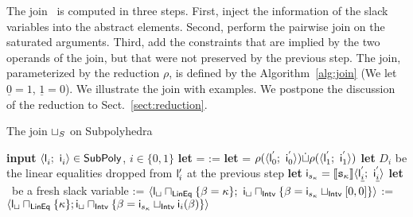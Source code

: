 \documentclass{llncs}
\begin{document}
The join \joinS\ is computed in three steps.
First,  inject the information of the slack variables into the abstract elements.
Second,  perform the  pairwise join  on the saturated arguments. 
Third, add the constraints that are implied by the two operands of the join, but that were not preserved by the previous step.
The join, parameterized by the reduction $\rho$,  is defined by the Algorithm~\ref{alg:join} 
(We let $\underline{0} = 1$, $\underline{1} = 0$).
We illustrate the join with examples. 
 We postpone the discussion of the reduction to Sect.~\ref{sect:reduction}.

\begin{algorithm}[t]
\caption{The join $\sqcup_{S}$ on Subpolyhedra}
\label{alg:join}
\begin{algorithmic}
\STATE \textbf{input} $\langle \mathsf{\mathsf{l}}_{i}^{};\ \mathsf{\mathsf{i}}_{i}^{} \rangle \in \mathsf{SubPoly}$, $i \in \{0, 1\}$
\medskip
\STATE \textbf{let}  = 
\STATE
\smallskip
{}
\STATE   {} :=   
\ENDFOR
\STATE
\smallskip
{}
\STATE  \textbf{let}  \subpolyPair{\sqcup}{} = $\rho(\langle \mathsf{\mathsf{l}}_{0}^{'};\ \mathsf{\mathsf{i}}_{0}^{'} \rangle) \dot\sqcup   \rho(\langle \mathsf{\mathsf{l}}_{1}^{'};\ \mathsf{\mathsf{i}}_{1}^{'} \rangle)$
\STATE
\smallskip
{}
\STATE \textbf{let} $D_{i}$ be the linear equalities dropped from $\mathsf{\mathsf{l}}'_i$ at the previous step
\STATE \textbf{let} $\mathsf{\mathsf{i}}_{s_\kappa} = \llbracket \mathtt{s_\kappa} \rrbracket\langle \mathsf{\mathsf{l}}_{\underline{i}}^{'};\ \mathsf{\mathsf{i}}_{\underline{i}}^{'} \rangle$
\STATE \textbf{let} \slackvar\  be a fresh slack variable
\STATE \subpolyPair{\sqcup}{} := $\langle \mathsf{\mathsf{l}}_\sqcup \sqcap_{\mathsf{LinEq}} \{ \beta_{} = \kappa\};\ \mathsf{\mathsf{i}}_\sqcup \sqcap_{\mathsf{Intv}} \{ \beta_{}= \mathsf{\mathsf{i}}_{s_\kappa} \sqcup_{\mathsf{Intv}} [0,0]\} \rangle$ 
\ENDIF
{}
\STATE  \subpolyPair{\sqcup}{} := $\langle \mathsf{\mathsf{l}}_\sqcup \sqcap_{\mathsf{LinEq}} \{ \kappa\};\mathsf{\mathsf{i}}_\sqcup \sqcap_{\mathsf{Intv}} \{ \beta_{} = \mathsf{\mathsf{i}}_{s_\kappa} \sqcup_{\mathsf{Intv}} \mathsf{\mathsf{i}}_i(\beta_{})\} \rangle$  
\ENDIF
\ENDIF
\ENDFOR
\RETURN  \subpolyPair{\sqcup}{} 
\end{algorithmic}
\end{algorithm}
\end{document}
